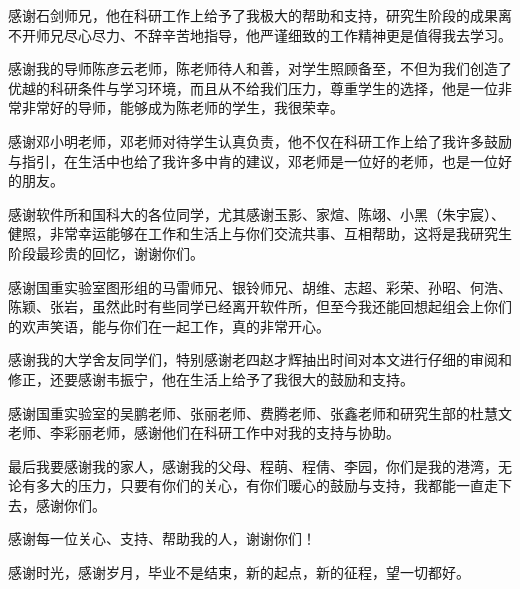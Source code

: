 感谢石剑师兄，他在科研工作上给予了我极大的帮助和支持，研究生阶段的成果离不开师兄尽心尽力、不辞辛苦地指导，他严谨细致的工作精神更是值得我去学习。

感谢我的导师陈彦云老师，陈老师待人和善，对学生照顾备至，不但为我们创造了优越的科研条件与学习环境，而且从不给我们压力，尊重学生的选择，他是一位非常非常好的导师，能够成为陈老师的学生，我很荣幸。

感谢邓小明老师，邓老师对待学生认真负责，他不仅在科研工作上给了我许多鼓励与指引，在生活中也给了我许多中肯的建议，邓老师是一位好的老师，也是一位好的朋友。

感谢软件所和国科大的各位同学，尤其感谢玉影、家煊、陈翊、小黑（朱宇宸）、健照，非常幸运能够在工作和生活上与你们交流共事、互相帮助，这将是我研究生阶段最珍贵的回忆，谢谢你们。

感谢国重实验室图形组的马雷师兄、银铃师兄、胡维、志超、彩荣、孙昭、何浩、陈颖、张岩，虽然此时有些同学已经离开软件所，但至今我还能回想起组会上你们的欢声笑语，能与你们在一起工作，真的非常开心。

感谢我的大学舍友同学们，特别感谢老四赵才辉抽出时间对本文进行仔细的审阅和修正，还要感谢韦振宁，他在生活上给予了我很大的鼓励和支持。

感谢国重实验室的吴鹏老师、张丽老师、费腾老师、张鑫老师和研究生部的杜慧文老师、李彩丽老师，感谢他们在科研工作中对我的支持与协助。

最后我要感谢我的家人，感谢我的父母、程萌、程倩、李园，你们是我的港湾，无论有多大的压力，只要有你们的关心，有你们暖心的鼓励与支持，我都能一直走下去，感谢你们。

感谢每一位关心、支持、帮助我的人，谢谢你们！

感谢时光，感谢岁月，毕业不是结束，新的起点，新的征程，望一切都好。
